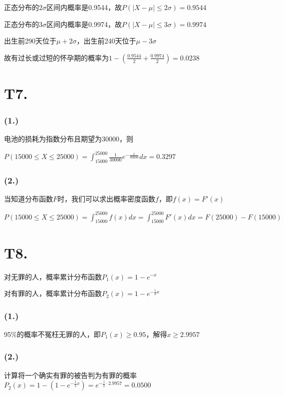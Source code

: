 \documentclass{article}
\newcommand\f[2]{\frac{#1}{#2}}
\begin{document}
正态分布的$2\sigma$区间内概率是0.9544，故$P(|X-\mu|\leq2\sigma)=0.9544$

正态分布的$3\sigma$区间内概率是0.9974，故$P(|X-\mu|\leq3\sigma)=0.9974$

出生前290天位于$\mu+2\sigma$，出生前240天位于$\mu-3\sigma$

故有过长或过短的怀孕期的概率为$1-(\f{0.9544}{2}+\f{0.9974}{2})=0.0238$

\section*{T7. }

\subsubsection*{(1.)}

电池的损耗为指数分布且期望为$30000$，则

$P(15000\leq X\leq25000)=\int_{15000}^{25000}\f{1}{30000}e^{-\f{x}{30000}}dx=0.3297$

\subsubsection*{(2.)}

当知道分布函数$F$时，我们可以求出概率密度函数$f$，即$f(x)=F'(x)$

$P(15000\leq X\leq25000)=\int_{15000}^{25000}f(x)dx=\int_{15000}^{25000}F'(x)dx=F(25000)-F(15000)$

\section*{T8. }

对无罪的人，概率累计分布函数$P_1(x)=1-e^{-x}$

对有罪的人，概率累计分布函数$P_2(x)=1-e^{-\f{1}{2}x}$

\subsubsection*{(1.)}

95\%的概率不冤枉无罪的人，即$P_1(x)\geq0.95$，解得$x\geq2.9957$

\subsubsection*{(2.)}

计算将一个确实有罪的被告判为有罪的概率$P_2(x)=1-(1-e^{-\f{1}{2}x})=e^{-\f{1}{2}\cdot 2.9957}=0.0500$
\end{document}
